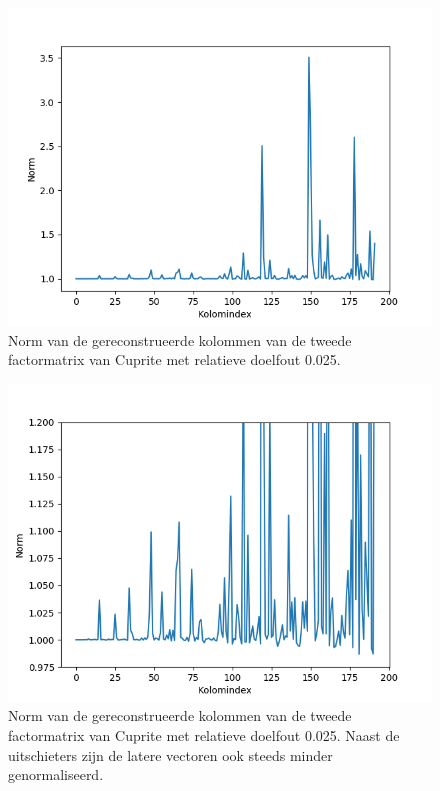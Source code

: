 \begin{figure}[]
  \centering
  \includegraphics[scale=0.7]{images/orthogonality_compression_norms1.png}
  \caption{Norm van de gereconstrueerde kolommen van de tweede factormatrix van Cuprite met relatieve doelfout 0.025.}
\label{fig:orthogonality-compression-norms1}
\end{figure}

\begin{figure}[]
  \centering
  \includegraphics[scale=0.7]{images/orthogonality_compression_norms2.png}
  \caption{Norm van de gereconstrueerde kolommen van de tweede factormatrix van Cuprite met relatieve doelfout 0.025. Naast de uitschieters zijn de latere vectoren ook steeds minder genormaliseerd.}
\label{fig:orthogonality-compression-norms2}
\end{figure}

